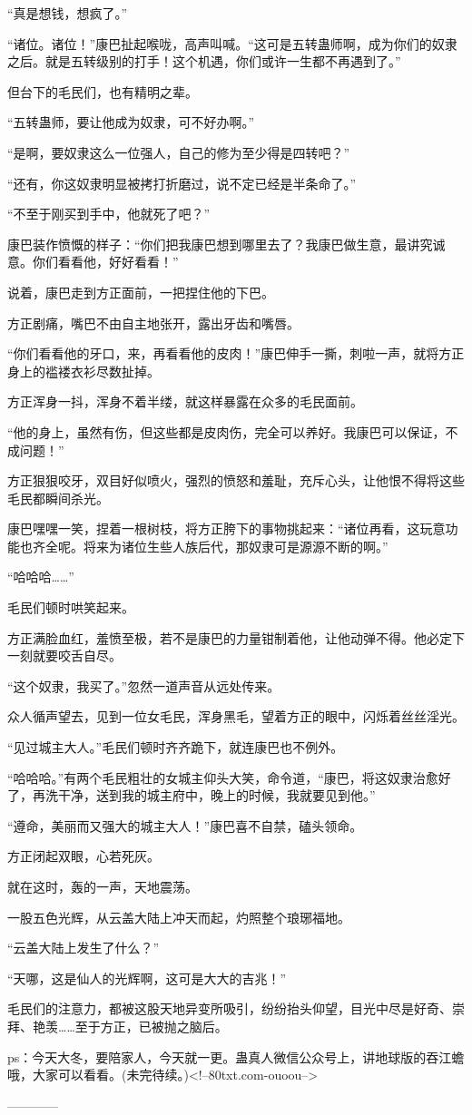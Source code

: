\begin{this_body}
“真是想钱，想疯了。”

“诸位。诸位！”康巴扯起喉咙，高声叫喊。“这可是五转蛊师啊，成为你们的奴隶之后。就是五转级别的打手！这个机遇，你们或许一生都不再遇到了。”

但台下的毛民们，也有精明之辈。

“五转蛊师，要让他成为奴隶，可不好办啊。”

“是啊，要奴隶这么一位强人，自己的修为至少得是四转吧？”

“还有，你这奴隶明显被拷打折磨过，说不定已经是半条命了。”

“不至于刚买到手中，他就死了吧？”

康巴装作愤慨的样子：“你们把我康巴想到哪里去了？我康巴做生意，最讲究诚意。你们看看他，好好看看！”

说着，康巴走到方正面前，一把捏住他的下巴。

方正剧痛，嘴巴不由自主地张开，露出牙齿和嘴唇。

“你们看看他的牙口，来，再看看他的皮肉！”康巴伸手一撕，刺啦一声，就将方正身上的褴褛衣衫尽数扯掉。

方正浑身一抖，浑身不着半缕，就这样暴露在众多的毛民面前。

“他的身上，虽然有伤，但这些都是皮肉伤，完全可以养好。我康巴可以保证，不成问题！”

方正狠狠咬牙，双目好似喷火，强烈的愤怒和羞耻，充斥心头，让他恨不得将这些毛民都瞬间杀光。

康巴嘿嘿一笑，捏着一根树枝，将方正胯下的事物挑起来：“诸位再看，这玩意功能也齐全呢。将来为诸位生些人族后代，那奴隶可是源源不断的啊。”

“哈哈哈……”

毛民们顿时哄笑起来。

方正满脸血红，羞愤至极，若不是康巴的力量钳制着他，让他动弹不得。他必定下一刻就要咬舌自尽。

“这个奴隶，我买了。”忽然一道声音从远处传来。

众人循声望去，见到一位女毛民，浑身黑毛，望着方正的眼中，闪烁着丝丝淫光。

“见过城主大人。”毛民们顿时齐齐跪下，就连康巴也不例外。

“哈哈哈。”有两个毛民粗壮的女城主仰头大笑，命令道，“康巴，将这奴隶治愈好了，再洗干净，送到我的城主府中，晚上的时候，我就要见到他。”

“遵命，美丽而又强大的城主大人！”康巴喜不自禁，磕头领命。

方正闭起双眼，心若死灰。

就在这时，轰的一声，天地震荡。

一股五色光辉，从云盖大陆上冲天而起，灼照整个琅琊福地。

“云盖大陆上发生了什么？”

“天哪，这是仙人的光辉啊，这可是大大的吉兆！”

毛民们的注意力，都被这股天地异变所吸引，纷纷抬头仰望，目光中尽是好奇、崇拜、艳羡……至于方正，已被抛之脑后。

ps：今天大冬，要陪家人，今天就一更。蛊真人微信公众号上，讲地球版的吞江蟾哦，大家可以看看。(未完待续。)<!--80txt.com-ouoou-->

------------

\end{this_body}

